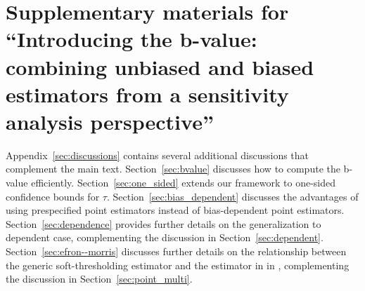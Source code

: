 \documentclass[11pt]{article}
\def\cI{{\mathcal I}}
\numberwithin{equation}{section}
\theoremstyle{definition}
\begin{document}
{%


}


\newpage

\appendix

\clearpage
\setcounter{page}{1}
\renewcommand{\thepage}{S\arabic{page}}

\section*{Supplementary materials for “Introducing the b-value: combining unbiased and biased estimators from a sensitivity analysis perspective”}

Appendix~\ref{sec:discussions} contains several additional discussions that complement the main text. Section~\ref{sec:bvalue} discusses how to compute the b-value efficiently. Section~\ref{sec:one_sided} extends our framework to one-sided confidence bounds for $\tau$. Section~\ref{sec:bias_dependent} discusses the advantages of using prespecified point estimators instead of bias-dependent point estimators. Section~\ref{sec:dependence} provides further details on the generalization to dependent case, complementing the discussion in Section~\ref{sec:dependent}. Section~\ref{sec:efron--morris} discusses further details on the relationship between the generic soft-thresholding estimator and the estimator in in \cite{j1981estimation, bickel1984parametric}, complementing the discussion in Section~\ref{sec:point_multi}.

\end{document}
